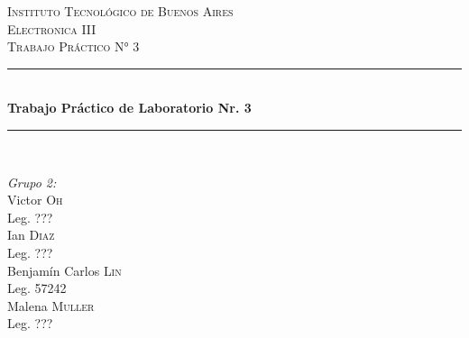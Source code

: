 \begin{titlepage}
    
\newcommand{\HRule}{\rule{\linewidth}{0.5mm}} %
    
\center %
     
    
\textsc{\LARGE Instituto Tecnológico de Buenos Aires}\\[2cm] %
\textsc{\Large Electronica III}\\[1.5cm] %
\textsc{\large Trabajo Práctico N° 3}\\[0.5cm] %
    
    
\HRule \\[0.5cm]
{ \huge \bfseries Trabajo Práctico de Laboratorio Nr. 3}\\[0.4cm] %
\HRule \\[2cm]
     
    
\begin{minipage}{0.4\textwidth}
\begin{flushleft} \large
\emph{Grupo 2:}\\		%
[.3cm]
Victor \textsc{Oh}\\
Leg. ???\\ 
[.3cm]
Ian \textsc{Diaz}\\
Leg. ???\\ 
[.3cm]
Benjamín Carlos \textsc{Lin}\\
Leg. 57242 \\ 
[.3cm]
Malena \textsc{Muller}\\
Leg. ???\\ 
[.3cm]
\end{flushleft}
\end{minipage}
~
\begin{minipage}{0.4\textwidth}
\begin{flushright} \large
\end{flushright}
\end{minipage}\\[2cm]
    

\end{titlepage}
